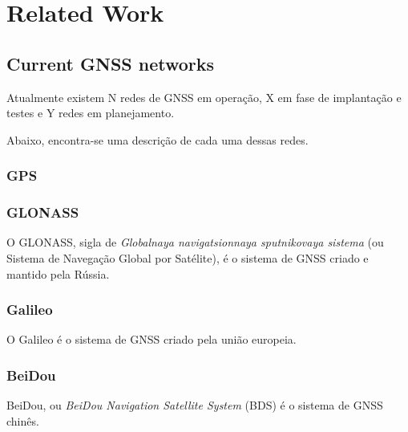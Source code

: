 %
%
%
%
%

%
%
%
%
%

\section{Related Work} \label{sec:related-work}

\subsection{Current GNSS networks}

Atualmente existem N redes de GNSS em operação, X em fase de implantação e testes e Y redes em planejamento.

Abaixo, encontra-se uma descrição de cada uma dessas redes.

\subsubsection{GPS}

\subsubsection{GLONASS}

O GLONASS, sigla de \textit{Globalnaya navigatsionnaya sputnikovaya sistema} (ou Sistema de Navegação Global por Satélite), é o sistema de GNSS criado e mantido pela Rússia.

\subsubsection{Galileo}

O Galileo é o sistema de GNSS criado pela união europeia.

\subsubsection{BeiDou}

BeiDou, ou \textit{BeiDou Navigation Satellite System} (BDS) é o sistema de GNSS chinês.






